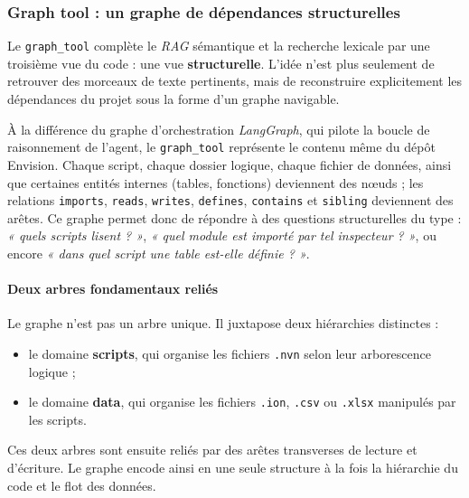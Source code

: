 \subsubsection{Graph tool : un graphe de dépendances structurelles}

Le \texttt{graph\_tool} complète le \textit{RAG} sémantique et la recherche lexicale par une troisième vue du code : une vue \textbf{structurelle}. L'idée n'est plus seulement de retrouver des morceaux de texte pertinents, mais de reconstruire explicitement les dépendances du projet sous la forme d'un graphe navigable.

À la différence du graphe d'orchestration \textit{LangGraph}, qui pilote la boucle de raisonnement de l'agent, le \texttt{graph\_tool} représente le contenu même du dépôt Envision. Chaque script, chaque dossier logique, chaque fichier de données, ainsi que certaines entités internes (tables, fonctions) deviennent des nœuds ; les relations \texttt{imports}, \texttt{reads}, \texttt{writes}, \texttt{defines}, \texttt{contains} et \texttt{sibling} deviennent des arêtes. Ce graphe permet donc de répondre à des questions structurelles du type : \textit{« quels scripts lisent  ? »}, \textit{« quel module est importé par tel inspecteur ? »}, ou encore \textit{« dans quel script une table est-elle définie ? »}.

\paragraph{Deux arbres fondamentaux reliés}
Le graphe n'est pas un arbre unique. Il juxtapose deux hiérarchies distinctes :
\begin{itemize}
    \item le domaine \textbf{scripts}, qui organise les fichiers \texttt{.nvn} selon leur arborescence logique ;
    \item le domaine \textbf{data}, qui organise les fichiers \texttt{.ion}, \texttt{.csv} ou \texttt{.xlsx} manipulés par les scripts.
\end{itemize}
Ces deux arbres sont ensuite reliés par des arêtes transverses de lecture et d'écriture. Le graphe encode ainsi en une seule structure à la fois la hiérarchie du code et le flot des données.

